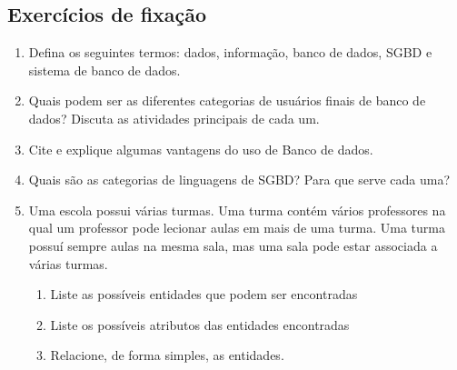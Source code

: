 \subsection{Exercícios de fixação}

\begin{enumerate}
	\item Defina os seguintes termos: dados, informação, banco de dados, SGBD e sistema de banco de dados.
	\item Quais podem ser as diferentes categorias de usuários finais de banco de dados? Discuta as atividades principais de cada um.
	\item Cite e explique algumas vantagens do uso de Banco de dados.
	\item Quais são as categorias de linguagens de SGBD? Para que serve cada uma?
	\item Uma escola possui várias turmas. Uma turma contém vários professores na qual um professor pode lecionar aulas em mais de uma turma. Uma turma possuí sempre aulas na mesma sala, mas uma sala pode estar associada a várias turmas.
	\begin{enumerate}
		\item Liste as possíveis entidades que podem ser encontradas
		\item Liste os possíveis atributos das entidades encontradas
		\item Relacione, de forma simples, as entidades.
	\end{enumerate}
\end{enumerate}